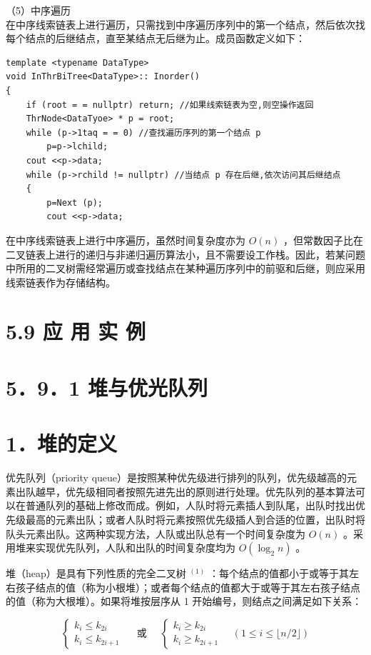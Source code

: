 \documentclass[10pt]{article}
\begin{document}
（5）中序遍历\\
在中序线索链表上进行遍历，只需找到中序遍历序列中的第一个结点，然后依次找每个结点的后继结点，直至某结点无后继为止。成员函数定义如下：

\begin{verbatim}
template <typename DataType>
void InThrBiTree<DataType>:: Inorder()
{
    if (root = = nullptr) return; //如果线索链表为空,则空操作返回
    ThrNode<DataTyoe> * p = root;
    while (p->1taq = = 0) //查找遍历序列的第一个结点 p
        p=p->lchild;
    cout <<p->data;
    while (p->rchild != nullptr) //当结点 p 存在后继,依次访问其后继结点
    {
        p=Next (p);
        cout <<p->data;
\end{verbatim}

在中序线索链表上进行中序遍历，虽然时间复杂度亦为 $O(n)$ ，但常数因子比在二叉链表上进行的递归与非递归遍历算法小，且不需要设工作栈。因此，若某问题中所用的二叉树需经常遍历或查找结点在某种遍历序列中的前驱和后继，则应采用线索链表作为存储结构。

\section*{5.9 应 用 实 例}
\section*{5．9．1 堆与优光队列}
\section*{1．堆的定义}
优先队列（priority queue）是按照某种优先级进行排列的队列，优先级越高的元素出队越早，优先级相同者按照先进先出的原则进行处理。优先队列的基本算法可以在普通队列的基础上修改而成。例如，人队时将元素插人到队尾，出队时找出优先级最高的元素出队；或者人队时将元素按照优先级插人到合适的位置，出队时将队头元素出队。这两种实现方法，人队或出队总有一个时间复杂度为 $O(n)$ 。采用堆来实现优先队列，人队和出队的时间复杂度均为 $O\left(\log _{2} n\right)$ 。

堆（heap）是具有下列性质的完全二叉树 ${ }^{(1)}$ ：每个结点的值都小于或等于其左右孩子结点的值（称为小根堆）；或者每个结点的值都大于或等于其左右孩子结点的值（称为大根堆）。如果将堆按层序从 1 开始编号，则结点之间满足如下关系：

$$
\left\{\begin{array} { l } 
{ k _ { i } \leqslant k _ { 2 i } } \\
{ k _ { i } \leqslant k _ { 2 i + 1 } }
\end{array} \quad \text { 或 } \quad \left\{\begin{array}{l}
k_{i} \geqslant k_{2 i} \\
k_{i} \geqslant k_{2 i+1}
\end{array} \quad(1 \leqslant i \leqslant\lfloor n / 2\rfloor)\right.\right.
$$
\end{document}
